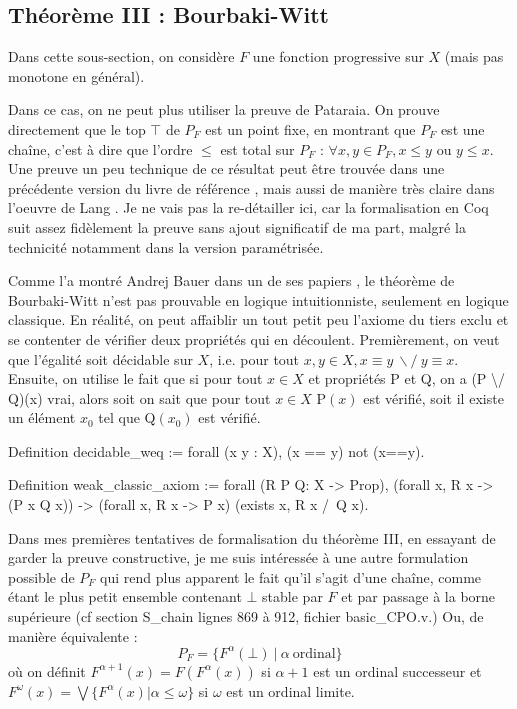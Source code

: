 \documentclass{article}
\newcommand\code[1]{{\fontfamily{lmtt}\selectfont #1}}
\theoremstyle{definition}
\begin{document}
\subsection{Théorème III : Bourbaki-Witt}

Dans cette sous-section, on considère $F$ une fonction progressive sur $X$ (mais pas monotone en général).

Dans ce cas, on ne peut plus utiliser la preuve de Pataraia. On prouve directement que le top $\top$ de $P_F$ est un point fixe, en montrant que $P_F$ est une chaîne, c'est à dire que l'ordre $\leq$ est total sur $P_F$ : $\forall x, y \in P_F, x \leq y$ ou $y \leq x$. Une preuve un peu technique de ce résultat peut être trouvée dans une précédente version du livre de référence %
, mais aussi de manière très claire dans l'oeuvre de Lang \cite{lang02}.
Je ne vais pas la re-détailler ici, car la formalisation en Coq suit assez fidèlement la preuve sans ajout significatif de ma part, malgré la technicité notamment dans la version paramétrisée.

\medskip

Comme l'a montré Andrej Bauer dans un de ses papiers \cite{bw}, le théorème de Bourbaki-Witt n'est pas prouvable en logique intuitionniste, seulement en logique classique. En réalité, on peut affaiblir un tout petit peu l'axiome du tiers exclu et se contenter de vérifier deux propriétés qui en découlent. Premièrement, on veut que l'égalité soit décidable sur $X$, i.e. pour tout $x, y \in X, x \equiv y ~ \backslash/ ~ y \equiv x$. Ensuite, on utilise le fait que si pour tout $x \in X$ et propriétés \code{P} et \code{Q}, on a \code{(P \textbackslash/ Q)(x)} vrai, alors soit on sait que pour tout $x \in X$ \code{P}$(x)$ est vérifié, soit il existe un élément $x_0$ tel que \code{Q}$(x_0)$ est vérifié.

\begin{coq}
Definition decidable_weq := forall (x y : X), (x == y) \/ not (x==y).

Definition weak_classic_axiom := forall (R P Q: X -> Prop), 
	(forall x, R x -> (P x \/ Q x)) 
    -> (forall x, R x -> P x) \/ (exists x, R x /\ Q x).

\end{coq}

\medskip

Dans mes premières tentatives de formalisation du théorème III, en essayant de garder la preuve constructive, je me suis intéressée à une autre formulation possible de $P_F$ qui rend plus apparent le fait qu'il s'agit d'une chaîne, comme étant le plus petit ensemble contenant $\bot$ stable par $F$ et par passage à la borne supérieure (cf section \code{S\_chain} lignes 869 à 912, fichier \code{basic\_CPO.v}.) Ou, de manière équivalente :
$$ P_F = \{ F^\alpha(\bot) ~ | ~ \alpha ~ \text{ordinal} \}$$
où on définit $F^{\alpha + 1}(x) = F(F^\alpha(x))$ si $\alpha + 1$ est un ordinal successeur et $F^\omega(x) = \bigvee \{ F^\alpha(x) | \alpha \leqslant \omega \}$ si $\omega$ est un ordinal limite.
\end{document}

